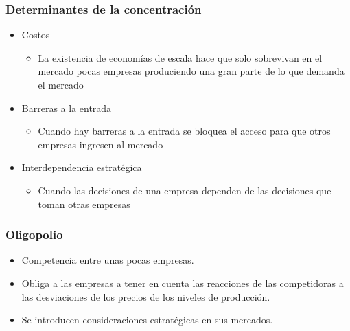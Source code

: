 \documentclass{beamer}
\begin{document}
\begin{frame}
\frametitle{Determinantes de la concentración}
\begin{itemize}
    \item Costos
        \begin{itemize}
        \item La existencia de economías de escala hace que solo sobrevivan en el mercado pocas empresas produciendo una gran parte de lo que demanda el mercado 
        \end{itemize}
    \vspace{2mm}
    \item Barreras a la entrada 
        \begin{itemize}
        \item Cuando hay barreras a la entrada se bloquea el acceso para que otros empresas ingresen al mercado
        \end{itemize}
    \vspace{2mm}
    \item Interdependencia estratégica
        \begin{itemize}
        \item Cuando las decisiones de una empresa dependen de las decisiones que toman otras empresas 
        \end{itemize}
    \end{itemize}
\end{frame}

\begin{frame}
\frametitle{Oligopolio}
\begin{itemize}
    \item Competencia entre unas pocas empresas. \vspace{4mm}
    \item Obliga a las empresas a tener en cuenta las reacciones de las competidoras a las desviaciones de los precios de los niveles de producción.\vspace{4mm}
    \item Se introducen consideraciones estratégicas en sus mercados.
\end{itemize}
\end{frame}
\end{document}

